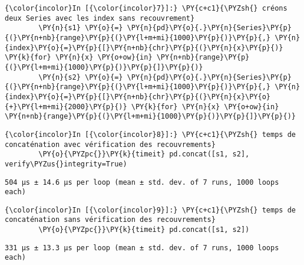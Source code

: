     \begin{Verbatim}[commandchars=\\\{\},frame=single,framerule=0.3mm,rulecolor=\color{cellframecolor}]
{\color{incolor}In [{\color{incolor}7}]:} \PY{c+c1}{\PYZsh{} créons deux Series avec les index sans recouvrement}
        \PY{n}{s1} \PY{o}{=} \PY{n}{pd}\PY{o}{.}\PY{n}{Series}\PY{p}{(}\PY{n+nb}{range}\PY{p}{(}\PY{l+m+mi}{1000}\PY{p}{)}\PY{p}{,} \PY{n}{index}\PY{o}{=}\PY{p}{[}\PY{n+nb}{chr}\PY{p}{(}\PY{n}{x}\PY{p}{)} \PY{k}{for} \PY{n}{x} \PY{o+ow}{in} \PY{n+nb}{range}\PY{p}{(}\PY{l+m+mi}{1000}\PY{p}{)}\PY{p}{]}\PY{p}{)}
        \PY{n}{s2} \PY{o}{=} \PY{n}{pd}\PY{o}{.}\PY{n}{Series}\PY{p}{(}\PY{n+nb}{range}\PY{p}{(}\PY{l+m+mi}{1000}\PY{p}{)}\PY{p}{,} \PY{n}{index}\PY{o}{=}\PY{p}{[}\PY{n+nb}{chr}\PY{p}{(}\PY{n}{x}\PY{o}{+}\PY{l+m+mi}{2000}\PY{p}{)} \PY{k}{for} \PY{n}{x} \PY{o+ow}{in} \PY{n+nb}{range}\PY{p}{(}\PY{l+m+mi}{1000}\PY{p}{)}\PY{p}{]}\PY{p}{)}
\end{Verbatim}


    \begin{Verbatim}[commandchars=\\\{\},frame=single,framerule=0.3mm,rulecolor=\color{cellframecolor}]
{\color{incolor}In [{\color{incolor}8}]:} \PY{c+c1}{\PYZsh{} temps de concaténation avec vérification des recouvrements}
        \PY{o}{\PYZpc{}}\PY{k}{timeit} pd.concat([s1, s2], verify\PYZus{}integrity=True)
\end{Verbatim}


    \begin{Verbatim}[commandchars=\\\{\},frame=single,framerule=0.3mm,rulecolor=\color{cellframecolor}]
504 µs ± 14.6 µs per loop (mean ± std. dev. of 7 runs, 1000 loops each)
\end{Verbatim}

    \begin{Verbatim}[commandchars=\\\{\},frame=single,framerule=0.3mm,rulecolor=\color{cellframecolor}]
{\color{incolor}In [{\color{incolor}9}]:} \PY{c+c1}{\PYZsh{} temps de concaténation sans vérification des recouvrements}
        \PY{o}{\PYZpc{}}\PY{k}{timeit} pd.concat([s1, s2])
\end{Verbatim}


    \begin{Verbatim}[commandchars=\\\{\},frame=single,framerule=0.3mm,rulecolor=\color{cellframecolor}]
331 µs ± 13.3 µs per loop (mean ± std. dev. of 7 runs, 1000 loops each)
\end{Verbatim}

